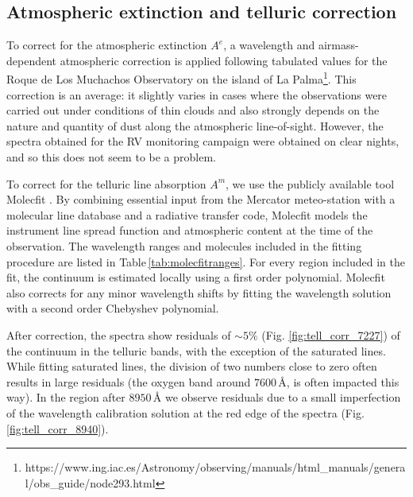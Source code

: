 \subsection{Atmospheric extinction and telluric correction}
\label{sec:atm_corr}
To correct for the atmospheric extinction $A^e$, a wavelength and airmass-dependent atmospheric correction is applied following tabulated values for the Roque de Los Muchachos Observatory on the island of La Palma\footnote{https://www.ing.iac.es/Astronomy/observing/manuals/html\_manuals/general/obs\_guide/node293.html}. This correction is an average: it slightly varies in cases where the observations were carried out under conditions of thin clouds and also strongly depends on the nature and quantity of dust along the atmospheric line-of-sight. However, the spectra obtained for the RV monitoring campaign were obtained on clear nights, and so this does not seem to be a problem.

To correct for the telluric line absorption $A^m$, we use the publicly available tool Molecfit \citep{smette_molecfit_2015,kausch_molecfit_2015}. By combining essential input from the Mercator meteo-station with a molecular line database and a radiative transfer code, Molecfit models the instrument line spread function and atmospheric content at the time of the observation. The wavelength ranges and molecules included in the fitting procedure are listed in Table\,\ref{tab:molecfitranges}. For every region included in the fit, the continuum is estimated locally using a first order polynomial. Molecfit also corrects for any minor wavelength shifts by fitting the wavelength solution with a second order Chebyshev polynomial. 

After correction, the spectra show residuals of $\sim\!\!5\%$ (Fig. \ref{fig:tell_corr_7227}) of the continuum in the telluric bands, with the exception of the saturated lines. While fitting saturated lines, the division of two numbers close to zero often results in large residuals (the oxygen band around $7600\,$\r{A}, is often impacted this way). In the region after $8950\,$\r{A} we observe residuals due to a small imperfection of the wavelength calibration solution at the red edge of the spectra (Fig. \ref{fig:tell_corr_8940}).


